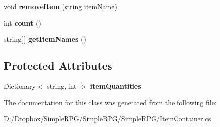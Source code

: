 \begin{DoxyCompactItemize}
\item 
\hypertarget{class_simple_r_p_g_1_1_item_container_af25b73361cb340c7d269d7899e298863}{void {\bfseries remove\+Item} (string item\+Name)}\label{class_simple_r_p_g_1_1_item_container_af25b73361cb340c7d269d7899e298863}

\item 
\hypertarget{class_simple_r_p_g_1_1_item_container_ad2e359e69ee0ce1803484a5e2297c832}{int {\bfseries count} ()}\label{class_simple_r_p_g_1_1_item_container_ad2e359e69ee0ce1803484a5e2297c832}

\item 
\hypertarget{class_simple_r_p_g_1_1_item_container_a70f22b47613da478f2d214c01fc2155a}{string\mbox{[}$\,$\mbox{]} {\bfseries get\+Item\+Names} ()}\label{class_simple_r_p_g_1_1_item_container_a70f22b47613da478f2d214c01fc2155a}

\end{DoxyCompactItemize}
\subsection*{Protected Attributes}
\begin{DoxyCompactItemize}
\item 
\hypertarget{class_simple_r_p_g_1_1_item_container_a0034a3a35d900ba8998929555c8d7dcf}{Dictionary$<$ string, int $>$ {\bfseries item\+Quantities}}\label{class_simple_r_p_g_1_1_item_container_a0034a3a35d900ba8998929555c8d7dcf}

\end{DoxyCompactItemize}


The documentation for this class was generated from the following file\+:\begin{DoxyCompactItemize}
\item 
D\+:/\+Dropbox/\+Simple\+R\+P\+G/\+Simple\+R\+P\+G/\+Simple\+R\+P\+G/Item\+Container.\+cs\end{DoxyCompactItemize}
